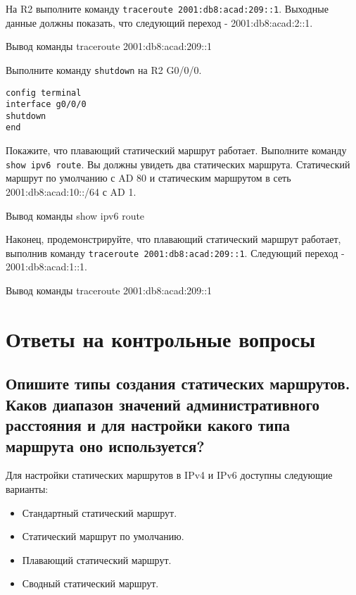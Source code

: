 На R2 выполните команду \texttt{traceroute 2001:db8:acad:209::1}.
Выходные данные должны показать, что следующий переход - 2001:db8:acad:2::1.

\begin{image}
    \caption{Вывод команды traceroute 2001:db8:acad:209::1}
\end{image}

Выполните команду \texttt{shutdown} на R2 G0/0/0.

\begin{verbatim}
config terminal
interface g0/0/0
shutdown
end
\end{verbatim}

Покажите, что плавающий статический маршрут работает.
Выполните команду \texttt{show ipv6 route}.
Вы должны увидеть два статических маршрута.
Статический маршрут по умолчанию с AD 80
и статическим маршрутом в сеть 2001:db8:acad:10::/64 с AD 1.

\begin{image}
    \caption{Вывод команды show ipv6 route}
\end{image}

Наконец, продемонстрируйте, что плавающий статический маршрут работает,
выполнив команду \texttt{traceroute 2001:db8:acad:209::1}.
Следующий переход - 2001:db8:acad:1::1.

\begin{image}
    \caption{Вывод команды traceroute 2001:db8:acad:209::1}
\end{image}


\section{Ответы на контрольные вопросы}

\subsection{Опишите типы создания статических маршрутов.
Каков диапазон значений административного расстояния
и для настройки какого типа маршрута оно используется?}

Для настройки статических маршрутов в IPv4 и IPv6 доступны следующие варианты:

\begin{itemize}
    \item Стандартный статический маршрут.
    \item Статический маршрут по умолчанию.
    \item Плавающий статический маршрут.
    \item Сводный статический маршрут.
\end{itemize}

